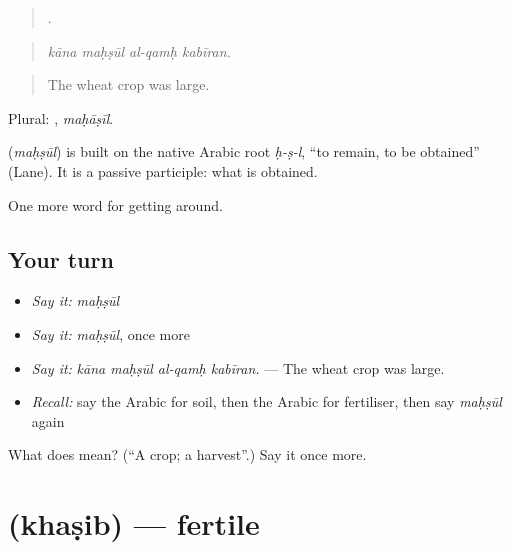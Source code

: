 \begin{quote}
   .
\end{quote}

\begin{quote}
\emph{kāna maḥṣūl al-qamḥ kabīran.}
\end{quote}

\begin{quote}
The wheat crop was large.
\end{quote}

Plural: , \emph{maḥāṣīl}.

\begin{cousinweb}
\textbf{} (\emph{maḥṣūl}) is built on the native Arabic root \emph{ḥ-ṣ-l}, \textquotedblleft{}to remain, to be obtained\textquotedblright{} (Lane). It is a passive participle: what is obtained.
\end{cousinweb}

\begin{grammarlens}[title={What you've built}]
One more word for getting around.
\end{grammarlens}

\subsection*{Your turn}
\begin{itemize}
\raggedright
  \item \emph{Say it:} \emph{maḥṣūl}
  \item \emph{Say it:} \emph{maḥṣūl}, once more
  \item \emph{Say it:} \emph{kāna maḥṣūl al-qamḥ kabīran.} — The wheat crop was large.
  \item \emph{Recall:} say the Arabic for soil, then the Arabic for fertiliser, then say \emph{maḥṣūl} again
\end{itemize}

\begin{tcolorbox}[breakable,colback=teal!4,colframe=teal!35!black,title={Before you move on}]
What does  mean? (\textquotedblleft{}A crop; a harvest\textquotedblright{}.) Say it once more.
\end{tcolorbox}
\section[\texorpdfstring{\ar{خصب} (khaṣib)}{خصب (khaṣib)}]{ (khaṣib) — fertile}

\label{lesson:AR-C469-khasib}



